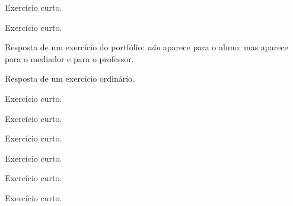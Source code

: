\documentclass[a4paper]{article}
\begin{document}
\begin{exercicio}
  Exercício curto.
\end{exercicio}

\begin{exercicio}
  Exercício curto.
\end{exercicio}

\begin{respostas}
  \begin{exercicio*}
    Resposta de um exercício do portfólio:
    \emph{não} aparece para o aluno;
    mas aparece para o mediador e para o professor.
  \end{exercicio*}
  
  \begin{exercicio}
    Resposta de um exercício ordinário.
  \end{exercicio}
  
  \begin{exercicio}
    \lipsum[1-18]
  \end{exercicio}
  
  \begin{exercicio}
    Exercício curto.
  \end{exercicio}

  \begin{exercicio}
    Exercício curto.
  \end{exercicio}

  \begin{exercicio}
    Exercício curto.
  \end{exercicio}

  \begin{exercicio}
    Exercício curto.
  \end{exercicio}

  \begin{exercicio}
    Exercício curto.
  \end{exercicio}

  \begin{exercicio}
    Exercício curto.
  \end{exercicio}
\end{respostas}
\end{document}
